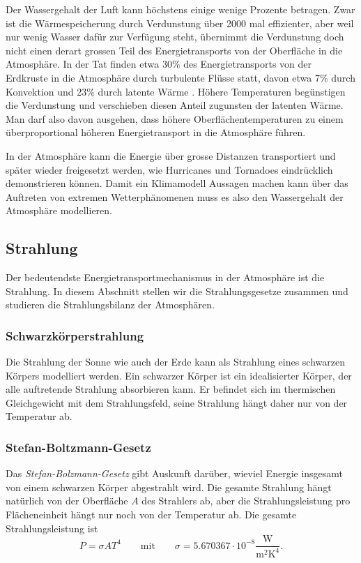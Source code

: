 Der Wassergehalt der Luft kann höchstens einige wenige Prozente betragen.
Zwar ist die Wärmespeicherung durch Verdunstung über 2000 mal effizienter,
aber weil nur wenig Wasser dafür zur Verfügung steht, übernimmt die Verdunstung
doch nicht einen derart grossen Teil des Energietransports von der
Oberfläche in die Atmosphäre.
In der Tat finden etwa 30\% des Energietransports von der Erdkruste
in die Atmosphäre durch turbulente Flüsse statt, davon etwa
7\% durch Konvektion und 23\% durch latente Wärme
\cite[S.~70]{skript:wiefunktioniertdas}.
Höhere Temperaturen begünstigen die Verdunstung und verschieben diesen
Anteil zugunsten der latenten Wärme.
Man darf also davon ausgehen, dass höhere Oberflächentemperaturen
zu einem überproportional höheren Energietransport in die Atmosphäre
führen.

In der Atmosphäre kann die Energie über grosse Distanzen transportiert
und später wieder freigesetzt werden, wie Hurricanes und Tornadoes
eindrücklich demonstrieren können.
Damit ein Klimamodell Aussagen machen kann über das Auftreten von
extremen Wetterphänomenen muss es also den Wassergehalt der
Atmosphäre modellieren.

\subsection{Strahlung\label{skript:grundlagen:strahlung}}
Der bedeutendste Energietransportmechanismus in der Atmosphäre ist
die Strahlung.
In diesem Abschnitt stellen wir die Strahlungsgesetze zusammen und
studieren die Strahlungsbilanz der Atmosphären.

\subsubsection{Schwarzkörperstrahlung}
%
Die Strahlung der Sonne wie auch der Erde kann als Strahlung eines
schwarzen Körpers modelliert werden.
Ein schwarzer Körper ist ein idealisierter Körper, der alle auftretende
Strahlung absorbieren kann.
Er befindet sich im thermischen Gleichgewicht mit dem Strahlungsfeld,
seine Strahlung hängt daher nur von der Temperatur ab.

\subsubsection{Stefan-Boltzmann-Gesetz}
Das {\em Stefan-Bolzmann-Gesetz} gibt Auskunft darüber, wieviel
Energie insgesamt von einem schwarzen Körper abgestrahlt wird.
Die gesamte Strahlung hängt natürlich von der Oberfläche $A$ des Strahlers ab,
aber die Strahlungsleistung pro Flächeneinheit hängt
nur noch von der
Temperatur ab.
Die gesamte Strahlungsleistung ist
\begin{equation}
P=\sigma AT^4
\qquad \text{mit}\qquad
\sigma=5.670367\cdot10^{-8}\frac{\text{W}}{\text{m}^2\text{K}^4}.
\label{skript:stefon-boltzmann}
\end{equation}

